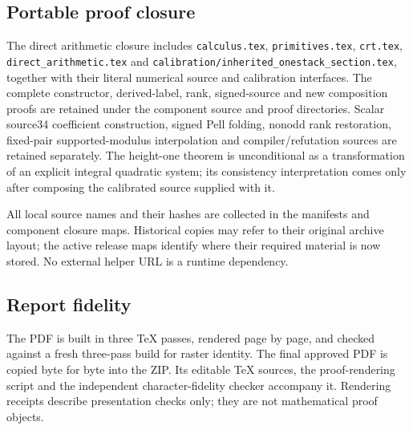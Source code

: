 \subsection{Portable proof closure}
The direct arithmetic closure includes \nolinkurl{calculus.tex}, \nolinkurl{primitives.tex}, \nolinkurl{crt.tex}, \nolinkurl{direct_arithmetic.tex} and \nolinkurl{calibration/inherited_onestack_section.tex}, together with their literal numerical source and calibration interfaces. The complete constructor, derived-label, rank, signed-source and new composition proofs are retained under the component source and proof directories. Scalar source34 coefficient construction, signed Pell folding, nonodd rank restoration, fixed-pair supported-modulus interpolation and compiler/refutation sources are retained separately. The height-one theorem is unconditional as a transformation of an explicit integral quadratic system; its consistency interpretation comes only after composing the calibrated source supplied with it.

All local source names and their hashes are collected in the manifests and component closure maps. Historical copies may refer to their original archive layout; the active release maps identify where their required material is now stored. No external helper URL is a runtime dependency.

\subsection{Report fidelity}
The PDF is built in three TeX passes, rendered page by page, and checked against a fresh three-pass build for raster identity. The final approved PDF is copied byte for byte into the ZIP. Its editable TeX sources, the proof-rendering script and the independent character-fidelity checker accompany it. Rendering receipts describe presentation checks only; they are not mathematical proof objects.
